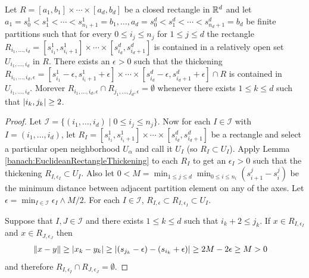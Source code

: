 \begin{lem}\label{banach:PrimitiveFollowingMappingThickening}Let $R= [a_1, b_1] \times \cdots \times [a_d, b_d]$ be a closed rectangle in $\mathbb{R}^d$ and let $a_1 = s^1_0 < s^1_1 < \cdots < s^1_{n_1 + 1} = b_1, \dots, a_d = s^d_0 < s^d_1 < \cdots < s^d_{n_d + 1} = b_d$ be finite partitions such that for every $0 \leq i_j \leq n_j$ for $1\leq j \leq d$ the rectangle $R_{i_1, \dots, i_d} = [s^1_{i_1}, s^1_{i_i+1}] \times \cdots \times [s^d_{i_d}, s^d_{i_d+1}]$ is contained in a relatively open set $U_{i_1, \dots, i_d}$ in $R$.   There exists an $\epsilon>0$ such that the thickening $R_{i_1, \dots, i_d, \epsilon} = [s^1_{i_1}  - \epsilon, s^1_{i_i+1}+\epsilon] \times \cdots \times [s^d_{i_d} - \epsilon, s^d_{i_d+1} + \epsilon] \cap R$ is contained in $U_{i_1, \dots, i_d}$.   Morever $R_{i_1, \dots, i_d, \epsilon}  \cap R_{j_1, \dots, j_d, \epsilon} =\emptyset$ whenever there exists $1 \leq k \leq d$ such that $\left \vert i_k, j_k \right \vert \geq 2$.
\end{lem}
\begin{proof}
  Let $\mathcal{I} = \lbrace (i_1, \dots, i_d) \mid 0 \leq i_j \leq n_j \rbrace$.   Now for each $I \in \mathcal{I}$ with $I = (i_1, \dots, i_d)$, let $R_I = [s^1_{i_1}, s^1_{i_i+1}] \times \cdots \times [s^d_{i_d}, s^d_{i_d+1}]$ be a rectangle and select a particular open neighborhood $U_\alpha$ and call it $U_I$ (so $R_I \subset U_I$).  Apply Lemma \ref{banach:EuclideanRectangleThickening} to each $R_I$ to get an $\epsilon_I > 0$ such that the thickening $R_{I, \epsilon_I} \subset U_I$.   Also let $0 < M = \min_{1 \leq j \leq d} \min_{0 \leq i \leq n_i} (s^j_{i+1} - s^j_i)$ be the minimum distance between adjacent partition element on any of the axes.  Let $\epsilon = \min_{I \in \mathcal{I}} \epsilon_I \wedge M/2$.   For each $I \in \mathcal{I}$, $R_{I, \epsilon} \subset R_{I, \epsilon_I} \subset U_I$.

  Suppose that $I, J \in \mathcal{I}$ and there exists $1 \leq k \leq d$ such that $i_k +2 \leq j_k$.   If $x \in R_{I, \epsilon_I}$ and $x \in R_{J, \epsilon_J}$ then
  \begin{align*}
    \left \lVert x - y \right \rVert &\geq \left \vert x_k - y_k \right \vert \geq \left \vert (s_{j_k} - \epsilon) - (s_{i_k} + \epsilon) \right \vert \geq 2M - 2\epsilon \geq M > 0
  \end{align*}
  and therefore $R_{I, \epsilon_I} \cap R_{J, \epsilon_J} = \emptyset$.
\end{proof}

